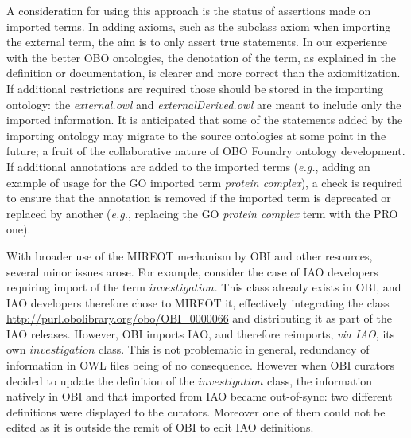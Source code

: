 \documentclass[jou]{ao2e}%
\begin{document}
A consideration for using this approach is the status of assertions made on imported terms.
In adding axioms, such as the subclass axiom when importing the external term, the aim is to only assert true statements.
In our experience with the better OBO ontologies, the denotation of the term, as explained in the definition or documentation, is clearer and more correct than the axiomitization. %
If additional restrictions are required those should be stored in the importing ontology: the \emph{external.owl} and \emph{externalDerived.owl} are meant to include only the imported information.
It is anticipated that some of the statements added by the importing ontology may migrate to the source ontologies at some point in the future; a fruit of the collaborative nature of OBO Foundry ontology development. %
If additional annotations are added to the imported terms (\emph{e.g.}, adding an example of usage for the \ac{GO} imported term \textit{protein complex}), a check is required to ensure that the annotation is removed if the imported term is deprecated or replaced by another (\emph{e.g.}, replacing  the \ac{GO} \textit{protein complex} term with the \ac{PRO}~\citep{PRO} one).

With broader use of the MIREOT mechanism by OBI and other resources, several minor issues arose.
For example, consider the case of \ac{IAO} developers requiring import of the term $investigation$.  This class already exists in \ac{OBI}, and \ac{IAO} developers therefore chose to MIREOT it, effectively integrating the class \url{http://purl.obolibrary.org/obo/OBI_0000066} and distributing it as part of the \ac{IAO} releases.
However, \ac{OBI} imports \ac{IAO}, and therefore reimports, \emph{via IAO}, its own $investigation$ class. This is not problematic in general, redundancy of information in OWL files being of no consequence. However when \ac{OBI} curators decided to update the definition of the $investigation$ class, the information natively in \ac{OBI} and that imported from \ac{IAO} became out-of-sync: two different definitions were displayed to the curators. Moreover one of them could not be edited as it is outside the remit of OBI to edit IAO definitions.
\end{document}
